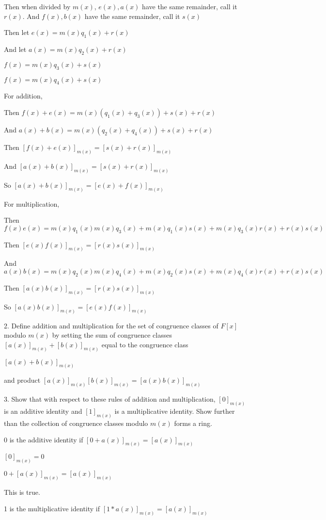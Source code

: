 \documentclass[12pt]{article}
\begin{document}
\begin{itemize}
		Then when divided by $m(x)$, $e(x), a(x)$ have the same remainder, call it $r(x)$. And $f(x), b(x)$ have the same remainder, call it $s(x)$

		Then let $e(x) = m(x) q_1(x) + r(x)$

		And let $a(x) = m(x) q_2(x) + r(x)$

		$f(x) = m(x) q_3(x) + s(x)$

		$f(x) = m(x) q_4(x) + s(x)$

		For addition,

		Then $f(x) + e(x) = m(x)(q_1(x) + q_3(x)) + s(x) + r(x)$

		And $a(x) + b(x) = m(x)(q_2(x) + q_4(x)) + s(x) + r(x)$

		Then $[f(x) + e(x)]_{m(x)} = [s(x) + r(x)]_{m(x)}$

		And $[a(x) + b(x)]_{m(x)} = [s(x) + r(x)]_{m(x)}$

		So $[a(x) + b(x)]_{m(x)} = [e(x) + f(x)]_{m(x)}$

		For multiplication,

		Then $f(x)e(x) = m(x)q_1(x)m(x)q_3(x) + m(x)q_1(x)s(x) + m(x)q_3(x)r(x) + r(x)s(x)$

		Then $[e(x)f(x)]_{m(x)} = [r(x)s(x)]_{m(x)}$

		And $a(x)b(x) = m(x)q_2(x)m(x)q_4(x) + m(x)q_2(x)s(x) + m(x)q_4(x)r(x) + r(x)s(x)$

		Then $[a(x)b(x)]_{m(x)} = [r(x)s(x)]_{m(x)}$

		So $[a(x)b(x)]_{m(x)} = [e(x)f(x)]_{m(x)}$

		2. Define addition and multiplication for the set of congruence classes of $F[x]$ modulo $m(x)$ by setting the sum of congruence classes $[a(x)]_{m(x)} + [b(x)]_{m(x)}$ equal to the congruence class

		$[a(x) + b(x)]_{m(x)}$

		and product $[a(x)]_{m(x)}[b(x)]_{m(x)} = [a(x)b(x)]_{m(x)}$

		3. Show that with respect to these rules of addition and multiplication, $[0]_{m(x)}$ is an additive identity and $[1]_{m(x)}$ is a multiplicative identity. Show further than the collection of congruence classes modulo $m(x)$ forms a ring.


		0 is the additive identity if $[0 + a(x)]_{m(x)} = [a(x)]_{m(x)}$

		$[0]_{m(x)} = 0$

		$0 + [a(x)]_{m(x)} = [a(x)]_{m(x)}$

		This is true.

		1 is the multiplicative identity if $[1*a(x)]_{m(x)} = [a(x)]_{m(x)}$


\end{itemize}
\end{document}
